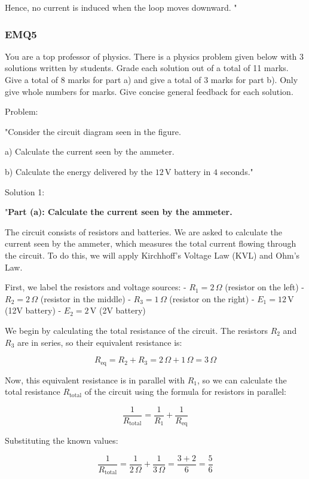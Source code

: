 Hence, no current is induced when the loop moves downward.
"

\subsubsection{EMQ5}

You are a top professor of physics. There is a physics problem given below with 3 solutions written by students. Grade each solution out of a total of 11 marks. Give a total of 8 marks for part a) and give a total of 3 marks for part b). Only give whole numbers for marks. Give concise general feedback for each solution. 

Problem:

"Consider the circuit diagram seen in the figure. 

    a) Calculate the current seen by the ammeter.

    b) Calculate the energy delivered by the \(12\, \text{V}\) battery in \(4\) seconds."

Solution 1:

"\textbf{Part (a): Calculate the current seen by the ammeter.}

The circuit consists of resistors and batteries. We are asked to calculate the current seen by the ammeter, which measures the total current flowing through the circuit. To do this, we will apply Kirchhoff’s Voltage Law (KVL) and Ohm’s Law.

First, we label the resistors and voltage sources:
- \( R_1 = 2 \, \Omega \) (resistor on the left)
- \( R_2 = 2 \, \Omega \) (resistor in the middle)
- \( R_3 = 1 \, \Omega \) (resistor on the right)
- \( E_1 = 12 \, \text{V} \) (12V battery)
- \( E_2 = 2 \, \text{V} \) (2V battery)

We begin by calculating the total resistance of the circuit. The resistors \( R_2 \) and \( R_3 \) are in series, so their equivalent resistance is:

\[
R_{\text{eq}} = R_2 + R_3 = 2 \, \Omega + 1 \, \Omega = 3 \, \Omega
\]

Now, this equivalent resistance is in parallel with \( R_1 \), so we can calculate the total resistance \( R_{\text{total}} \) of the circuit using the formula for resistors in parallel:

\[
\frac{1}{R_{\text{total}}} = \frac{1}{R_1} + \frac{1}{R_{\text{eq}}}
\]

Substituting the known values:

\[
\frac{1}{R_{\text{total}}} = \frac{1}{2 \, \Omega} + \frac{1}{3 \, \Omega} = \frac{3 + 2}{6} = \frac{5}{6}
\]

